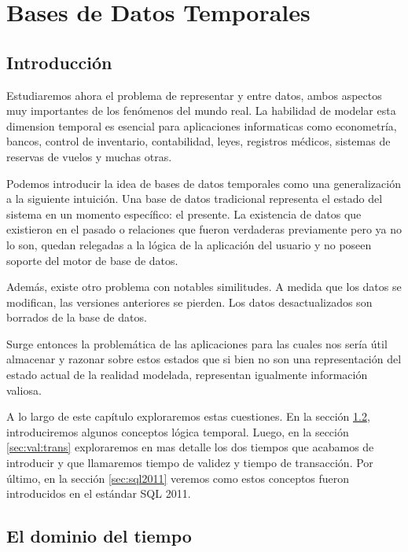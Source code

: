 \usepackage[utf8]{inputenc}
\chapter{Bases de Datos Temporales}  \label{cap:t}

\section{Introducción}

Estudiaremos ahora el problema de representar  y  entre datos,
ambos aspectos muy importantes de los fenómenos del mundo real.
La habilidad de modelar esta dimension temporal es esencial para aplicaciones informaticas como
econometría, bancos, control de inventario, contabilidad, leyes, registros médicos, sistemas de reservas de vuelos y muchas otras.

Podemos introducir la idea de bases de datos temporales como una generalización a la siguiente intuición.
Una base de datos tradicional representa el estado del sistema en un momento específico: el presente.
La existencia de datos que existieron en el pasado o relaciones que fueron verdaderas previamente pero ya no lo son,
quedan relegadas a la lógica de la aplicación del usuario y no poseen soporte del motor de base de datos.

Además, existe otro problema con notables similitudes. A medida que los datos se modifican, las versiones anteriores se pierden.
Los datos desactualizados son borrados de la base de datos.

Surge entonces la problemática de las aplicaciones para las cuales nos sería útil almacenar y razonar sobre estos estados que
si bien no son una representación del estado actual de la realidad modelada, representan igualmente información valiosa.

A lo largo de este capítulo exploraremos estas cuestiones.
En la sección \ref{sec:dominio:tiempo}, introduciremos algunos conceptos lógica temporal.
Luego, en la sección \ref{sec:val:trans} exploraremos en mas detalle los dos tiempos que acabamos de introducir
y que llamaremos tiempo de validez y tiempo de transacción.
Por último, en la sección \ref{sec:sql2011} veremos como estos conceptos fueron introducidos en el estándar SQL 2011.

\section{El dominio del tiempo}\label{sec:dominio:tiempo}

